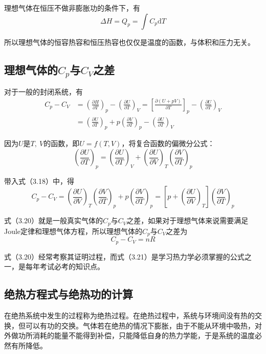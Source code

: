 \documentclass[lang=cn,newtx,10pt,scheme=chinese]{elegantbook}
\begin{document}
理想气体在恒压不做非膨胀功的条件下，有
\begin{equation}
	\Delta H=Q_p=\int C_p \mathrm{d}T
\end{equation}

所以理想气体的恒容热容和恒压热容也仅仅是温度的函数，与体积和压力无关。

\subsection{理想气体的$C_p$与$C_V$之差}
对于一般的封闭系统，有
\begin{equation}
	\begin{aligned}
		C_p-C_V &= \left ( \frac{\partial H}{\partial T}  \right )_p- \left ( \frac{\partial U}{\partial T}  \right )_V=\left [ \frac{\partial (U+pV)}{\partial T}  \right ]_p- \left ( \frac{\partial U}{\partial T}  \right )_V \\[1.5ex]
		&= \left ( \frac{\partial U}{\partial T}  \right )_p+p\left ( \frac{\partial V}{\partial T}  \right )_p-\left ( \frac{\partial U}{\partial T}  \right )_V
	\end{aligned}
\end{equation}

因为$U$是$T, \ V$的函数，即$U=f(T,V)$，将复合函数的偏微分公式：
\begin{equation}
	\left ( \frac{\partial U}{\partial T}  \right )_p = \left ( \frac{\partial U}{\partial T}  \right )_V+\left ( \frac{\partial U}{\partial V}  \right )_T \left ( \frac{\partial V}{\partial T}  \right )_p
\end{equation}

带入式（3.18）中，得
\begin{equation}
	C_p-C_V= \left ( \frac{\partial U}{\partial V}  \right )_T \left ( \frac{\partial V}{\partial T}  \right )_p+p\left ( \frac{\partial V}{\partial T}  \right )_p=\left [ p+\left ( \frac{\partial U}{\partial V}  \right )_T \right ] \left ( \frac{\partial V}{\partial T}  \right )_p
\end{equation}

式（3.20）就是一般真实气体的$C_p$与$C_V$之差，如果对于理想气体来说需要满足Joule定律和理想气体方程，所以理想气体的$C_p$与$C_V$之差为
\begin{equation}
	C_p-C_V=nR
\end{equation}

式（3.20）经常考察其证明过程，而式（3.21）是学习热力学必须掌握的公式之一，是每年考试必考的知识点。

\subsection{绝热方程式与绝热功的计算}
在绝热系统中发生的过程称为绝热过程。在绝热过程中，系统与环境间没有热的交换，但可以有功的交换。气体若在绝热的情况下膨胀，由于不能从环境中吸热，对外做功所消耗的能量不能得到补偿，只能降低自身的热力学能，于是系统的温度必然有所降低。
\end{document}
